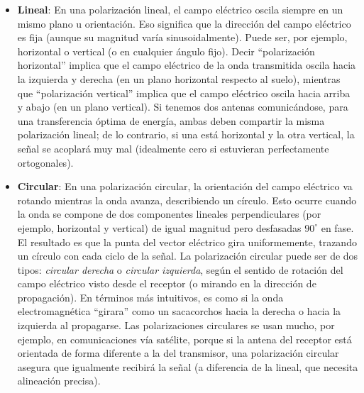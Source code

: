 \begin{itemize}
    \item \textbf{Lineal}: En una polarización lineal, el campo eléctrico oscila siempre en un mismo plano u orientación. Eso significa que la dirección del campo eléctrico es fija (aunque su magnitud varía sinusoidalmente). Puede ser, por ejemplo, horizontal o vertical (o en cualquier ángulo fijo). Decir “polarización horizontal” implica que el campo eléctrico de la onda transmitida oscila hacia la izquierda y derecha (en un plano horizontal respecto al suelo), mientras que “polarización vertical” implica que el campo eléctrico oscila hacia arriba y abajo (en un plano vertical). Si tenemos dos antenas comunicándose, para una transferencia óptima de energía, ambas deben compartir la misma polarización lineal; de lo contrario, si una está horizontal y la otra vertical, la señal se acoplará muy mal (idealmente cero si estuvieran perfectamente ortogonales).\\
    
    \item \textbf{Circular}: En una polarización circular, la orientación del campo eléctrico va rotando mientras la onda avanza, describiendo un círculo. Esto ocurre cuando la onda se compone de dos componentes lineales perpendiculares (por ejemplo, horizontal y vertical) de igual magnitud pero desfasadas $90^\circ$ en fase. El resultado es que la punta del vector eléctrico gira uniformemente, trazando un círculo con cada ciclo de la señal. La polarización circular puede ser de dos tipos: \textit{circular derecha} o \textit{circular izquierda}, según el sentido de rotación del campo eléctrico visto desde el receptor (o mirando en la dirección de propagación). En términos más intuitivos, es como si la onda electromagnética “girara” como un sacacorchos hacia la derecha o hacia la izquierda al propagarse. Las polarizaciones circulares se usan mucho, por ejemplo, en comunicaciones vía satélite, porque si la antena del receptor está orientada de forma diferente a la del transmisor, una polarización circular asegura que igualmente recibirá la señal (a diferencia de la lineal, que necesita alineación precisa).\\
    

\end{itemize}
